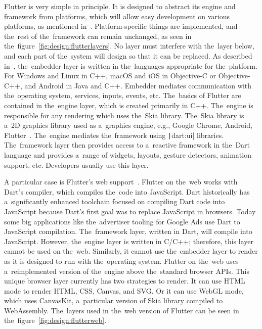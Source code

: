 Flutter is very simple in principle.
It is designed to abstract its engine and framework from platforms, which will allow easy development on various platforms, as mentioned in~\cite{a2022_flutter_architecture}.
Platform-specific things are implemented, and the~rest of the~framework can remain unchanged, as seen in the~figure~\ref{fig:design:flutterlayers}.
No layer must interfere with the~layer below, and each part of the~system will design so that it can be replaced.
As described in~\cite{a2022_flutter_architecture}, the~embedder layer is written in the~languages appropriate for the~platform.
For Windows and Linux in C++, macOS and iOS in Objective-C or Objective-C++, and Android in Java and C++.
Embedder mediates communication with the~operating system, services, inputs, events, etc.
The~basics of Flutter are contained in the~engine layer, which is created primarily in C++.
The~engine is responsible for any rendering which uses the~Skia library.
The~Skia library is a~2D graphics library used as a~graphics engine, e.g., Google Chrome, Android, Flutter~\cite{skia_2022_skia}.
The~engine mediates the~framework using \texttt|dart:ui| libraries.
The~framework layer then provides access to a~reactive framework in the~Dart language and provides a~range of widgets, layouts, gesture detectors, animation support, etc.
Developers usually use this layer.

A particular case is Flutter's web support~\cite{a2022_flutter_architecture}.
Flutter on the~web works with Dart's compiler, which compiles the~code into JavaScript.
Dart historically has a~significantly enhanced toolchain focused on compiling Dart code into JavaScript because Dart's first goal was to replace JavaScript in browsers.
Today some big applications like the~advertiser tooling for Google Ads use Dart to JavaScript compilation.
The~framework layer, written in Dart, will compile into JavaScript.
However, the~engine layer is written in C/C++; therefore, this layer cannot be used on the~web.
Similarly, it cannot use the~embedder layer to render as it is designed to run with the~operating system.
Flutter on the~web uses a~reimplemented version of the~engine above the~standard browser APIs.
This unique browser layer currently has two strategies to render.
It can use HTML mode to render HTML, CSS, Canvas, and SVG.
Or it can use WebGL mode, which uses CanvasKit, a~particular version of Skia library compiled to WebAssembly.
The~layers used in the~web version of Flutter can be seen in the~figure~\ref{fig:design:flutterweb}.

